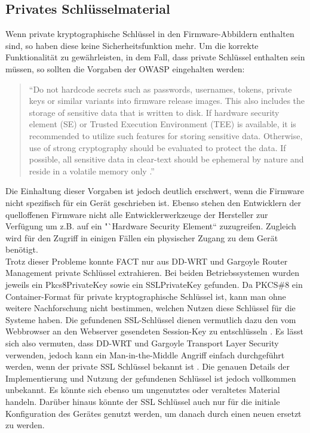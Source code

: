 \documentclass[a4paper]{book}
\begin{document}
\begin{large}
\begin{onehalfspace}
\end{onehalfspace}


\subsection{Privates Schlüsselmaterial}
\begin{onehalfspace}
Wenn private kryptographische Schlüssel in den Firmware-Abbildern enthalten sind, so haben diese keine Sicherheitsfunktion mehr. Um die korrekte Funktionalität zu gewährleisten, in dem Fall, dass private Schlüssel enthalten sein müssen, so sollten die Vorgaben der OWASP eingehalten werden:
\end{onehalfspace}

\begin{quote}
“Do not hardcode secrets such as passwords, usernames, tokens, private keys or similar variants into firmware release images. This also includes the storage of sensitive data that is written to disk. If hardware security element (SE) or Trusted Execution Environment (TEE) is available, it is recommended to utilize such features for storing sensitive data. Otherwise, use of strong cryptography should be evaluated to protect the data. If possible, all sensitive data in clear-text should be ephemeral by nature and reside in a volatile memory only \cite{OWASPEmbeddedApplicationSecurityProject.2019}.”
\end{quote}

\begin{onehalfspace}
\noindent
 Die Einhaltung dieser Vorgaben ist jedoch deutlich erschwert, wenn die Firmware nicht spezifisch für ein Gerät geschrieben ist. Ebenso stehen den Entwicklern der quelloffenen Firmware nicht alle Entwicklerwerkzeuge der Hersteller zur Verfügung um z.B. auf ein "`Hardware Security Element“ zuzugreifen. Zugleich wird für den Zugriff in einigen Fällen ein physischer Zugang zu dem Gerät benötigt. 	\\ \indent
	Trotz dieser Probleme konnte FACT nur aus DD-WRT und Gargoyle Router \mbox Management private Schlüssel extrahieren. Bei beiden Betriebssystemen wurden jeweils ein Pkcs8PrivateKey sowie ein SSLPrivateKey gefunden. Da PKCS\#8 ein Container-Format für private kryptographische Schlüssel ist, kann man ohne weitere Nachforschung nicht bestimmen, welchen Nutzen diese Schlüssel für die Systeme haben. Die gefundenen SSL-Schlüssel dienen vermutlich dazu den vom Webbrowser an den Webserver gesendeten Session-Key zu entschlüsseln \cite{sslKeys.}. Es lässt sich also vermuten, dass DD-WRT und Gargoyle Transport Layer Security verwenden, jedoch kann ein Man-in-the-Middle Angriff einfach durchgeführt werden, wenn der private SSL Schlüssel bekannt ist \cite{Du.21.10.201123.10.2011}. Die genauen Details der Implementierung und Nutzung der gefundenen Schlüssel ist jedoch vollkommen unbekannt. Es könnte sich ebenso um ungenutztes oder veraltetes Material handeln. Darüber hinaus könnte der SSL Schlüssel auch nur für die initiale Konfiguration des Gerätes genutzt werden, um danach durch einen neuen ersetzt zu werden. 
	


\end{onehalfspace}
\end{large}
\end{document}
